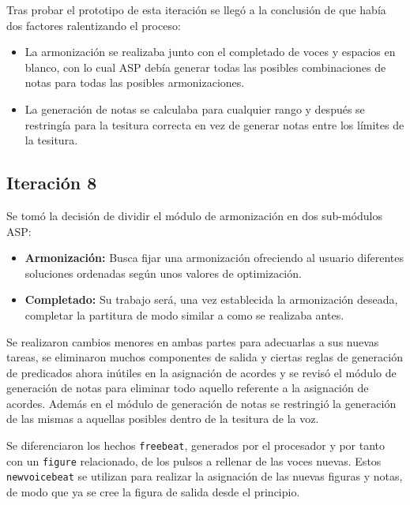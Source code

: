 Tras probar el prototipo de esta iteración se llegó a la conclusión de que había dos factores ralentizando el proceso:
\begin{itemize}
	\item La armonización se realizaba junto con el completado de voces y espacios en blanco, con lo cual ASP debía generar todas las posibles combinaciones de notas para todas las posibles armonizaciones.
	\item La generación de notas se calculaba para cualquier rango y después se restringía para la tesitura correcta en vez de generar notas entre los límites de la tesitura. 
\end{itemize}

\subsection{Iteración 8}
\label{subsec:eighth_iteration}
Se tomó la decisión de dividir el módulo de armonización en dos sub-módulos ASP:
\begin{itemize}
	\item \textbf{Armonización:} Busca fijar una armonización ofreciendo al usuario diferentes soluciones ordenadas según unos valores de optimización.
	\item \textbf{Completado:} Su trabajo será, una vez establecida la armonización deseada, completar la partitura de modo similar a como se realizaba antes.
\end{itemize}

Se realizaron cambios menores en ambas partes para adecuarlas a sus nuevas tareas, se eliminaron muchos componentes de salida y ciertas reglas de generación de predicados ahora inútiles en la asignación de acordes y se revisó el módulo de generación de notas para eliminar todo aquello referente a la asignación de acordes. Además en el módulo de generación de notas se restringió la generación de las mismas a aquellas posibles dentro de la tesitura de la voz.

Se diferenciaron los hechos \texttt{freebeat}, generados por el procesador y por tanto con un \texttt{figure} relacionado, de los pulsos a rellenar de las voces nuevas. Estos \texttt{newvoicebeat} se utilizan para realizar la asignación de las nuevas figuras y notas, de modo que ya se cree la figura de salida desde el principio. 
	
